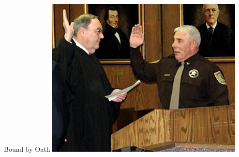 \begin{frame}{Bound by Oath}
    \centering
    \includegraphics[width=0.75\textwidth]{img/sheriff-oath.png} \\
\end{frame}
%
%
%
%
%
%
%

